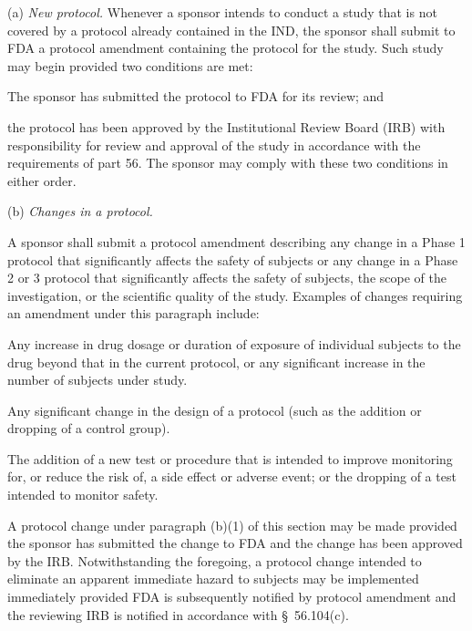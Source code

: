 (a) \textit{New protocol.} Whenever a sponsor intends to conduct a study that is not covered by a protocol already contained in the IND, the sponsor shall submit to FDA a protocol amendment containing the protocol for the study. Such study may begin provided two conditions are met:

\begin{description}[leftmargin=0.5cm,style=sameline]
\item[(1)] The sponsor has submitted the protocol to FDA for its review; and
\item[(2)] the protocol has been approved by the Institutional Review Board (IRB) with responsibility for review and approval of the study in accordance with the requirements of part 56. The sponsor may comply with these two conditions in either order.
\end{description}

(b) \textit{Changes in a protocol.}

\begin{description}[leftmargin=0.5cm,style=sameline]
\item[(1)] A sponsor shall submit a protocol amendment describing any change in a Phase 1 protocol that significantly affects the safety of subjects or any change in a Phase 2 or 3 protocol that significantly affects the safety of subjects, the scope of the investigation, or the scientific quality of the study. Examples of changes requiring an amendment under this paragraph include:
\begin{description}[leftmargin=0.8cm,style=sameline]
\item[(i)] Any increase in drug dosage or duration of exposure of individual subjects to the drug beyond that in the current protocol, or any significant increase in the number of subjects under study.
\item[(ii)] Any significant change in the design of a protocol (such as the addition or dropping of a control group).
\item[(iii)] The addition of a new test or procedure that is intended to improve monitoring for, or reduce the risk of, a side effect or adverse event; or the dropping of a test intended to monitor safety.
\end{description}
\item[(2)] A protocol change under paragraph (b)(1) of this section may be made provided the sponsor has submitted the change to FDA and the change has been approved by the IRB. Notwithstanding the foregoing, a protocol change intended to eliminate an apparent immediate hazard to subjects may be implemented immediately provided FDA is subsequently notified by protocol amendment and the reviewing IRB is notified in accordance with \S~56.104(c).
\end{description}

